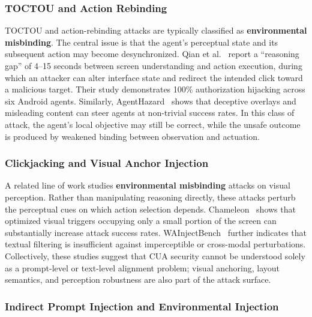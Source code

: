 \subsubsection{TOCTOU and Action Rebinding}

TOCTOU and action-rebinding attacks are typically classified as \textbf{environmental misbinding}. The central issue is that the agent’s perceptual state and its subsequent action may become desynchronized. Qian et al.~\cite{qian2026zero} report a ``reasoning gap'' of 4--15 seconds between screen understanding and action execution, during which an attacker can alter interface state and redirect the intended click toward a malicious target. Their study demonstrates 100\% authorization hijacking across six Android agents. Similarly, AgentHazard~\cite{liu2025hijacking} shows that deceptive overlays and misleading content can steer agents at non-trivial success rates. In this class of attack, the agent’s local objective may still be correct, while the unsafe outcome is produced by weakened binding between observation and actuation.

\subsubsection{Clickjacking and Visual Anchor Injection}

A related line of work studies \textbf{environmental misbinding} attacks on visual perception. Rather than manipulating reasoning directly, these attacks perturb the perceptual cues on which action selection depends. Chameleon~\cite{zhang2026realistic} shows that optimized visual triggers occupying only a small portion of the screen can substantially increase attack success rates. WAInjectBench~\cite{liu2025wainjectbench} further indicates that textual filtering is insufficient against imperceptible or cross-modal perturbations. Collectively, these studies suggest that CUA security cannot be understood solely as a prompt-level or text-level alignment problem; visual anchoring, layout semantics, and perception robustness are also part of the attack surface.

\subsubsection{Indirect Prompt Injection and Environmental Injection}


